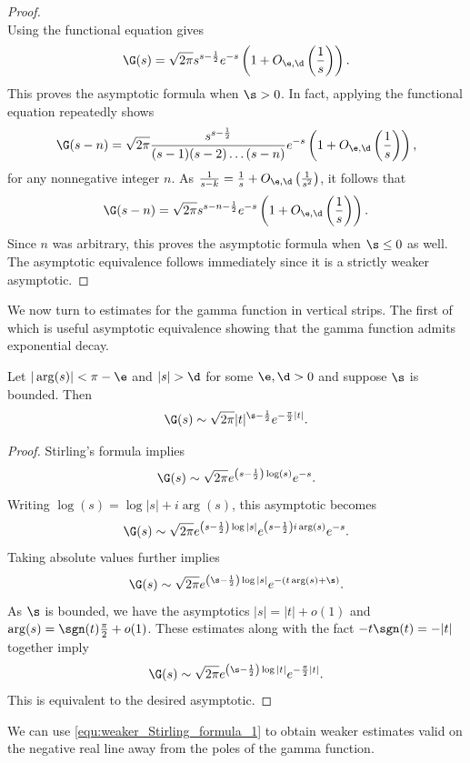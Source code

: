 \begin{proof}
\[    \]
    Using the functional equation gives
    \[
      \G(s) = \sqrt{2\pi}s^{s-\frac{1}{2}}e^{-s}\left(1+O_{\e,\d}\left(\frac{1}{s}\right)\right).
    \]
    This proves the asymptotic formula when \(\s > 0\). In fact, applying the functional equation repeatedly shows
    \[
      \G(s-n) = \sqrt{2\pi}\frac{s^{s-\frac{1}{2}}}{(s-1)(s-2) \ldots (s-n)}e^{-s}\left(1+O_{\e,\d}\left(\frac{1}{s}\right)\right),
    \]
    for any nonnegative integer \(n\). As \(\frac{1}{s-k} = \frac{1}{s}+O_{\e,\d}\left(\frac{1}{s^{2}}\right)\), it follows that
    \[
      \G(s-n) = \sqrt{2\pi}s^{s-n-\frac{1}{2}}e^{-s}\left(1+O_{\e,\d}\left(\frac{1}{s}\right)\right).
    \]
    Since \(n\) was arbitrary, this proves the asymptotic formula when \(\s \le 0\) as well. The asymptotic equivalence follows immediately since it is a strictly weaker asymptotic.
  \end{proof}

  We now turn to estimates for the gamma function in vertical strips. The first of which is useful asymptotic equivalence showing that the gamma function admits exponential decay.

  \begin{corollary}\label{equ:weaker_Stirling_formula_1}
    Let \(|\arg(s)| < \pi-\e\) and \(|s| > \d\) for some \(\e,\d > 0\) and suppose \(\s\) is bounded. Then
    \[
      \G(s) \sim \sqrt{2\pi}|t|^{\s-\frac{1}{2}}e^{-\frac{\pi}{2}|t|}.
    \]
  \end{corollary}
  \begin{proof}
    Stirling's formula implies
    \[
      \G(s) \sim \sqrt{2\pi}e^{\left(s-\frac{1}{2}\right)\log(s)}e^{-s}.
    \]
    Writing \(\log(s) = \log|s|+i\arg(s)\), this asymptotic becomes
    \[
      \G(s) \sim \sqrt{2\pi}e^{\left(s-\frac{1}{2}\right)\log|s|}e^{\left(s-\frac{1}{2}\right)i\arg(s)}e^{-s}.
    \]
    Taking absolute values further implies
    \[
      \G(s) \sim \sqrt{2\pi}e^{\left(\s-\frac{1}{2}\right)\log|s|}e^{-(t\arg(s)+\s)}.
    \]
    As \(\s\) is bounded, we have the asymptotics \(|s| = |t|+o(1)\) and \(\arg(s) = \sgn(t)\frac{\pi}{2}+o(1)\). These estimates along with the fact \(-t\sgn(t) = -|t|\) together imply
    \[
      \G(s) \sim \sqrt{2\pi}e^{\left(\s-\frac{1}{2}\right)\log|t|}e^{-\frac{\pi}{2}|t|}.
    \]
    This is equivalent to the desired asymptotic.
  \end{proof}

  We can use \cref{equ:weaker_Stirling_formula_1} to obtain weaker estimates valid on the negative real line away from the poles of the gamma function.

